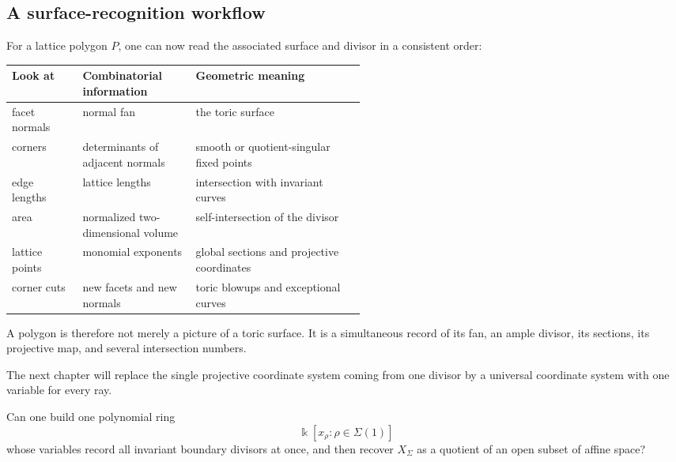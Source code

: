 \subsection{A surface-recognition workflow}

For a lattice polygon \(P\), one can now read the associated surface
and divisor in a consistent order:

\begin{center}
\small
\renewcommand{\arraystretch}{1.3}
\begin{tabularx}{0.94\linewidth}{@{}
  >{\raggedright\arraybackslash}p{0.20\linewidth}
  >{\raggedright\arraybackslash}p{0.32\linewidth}
  >{\raggedright\arraybackslash}X@{}}
\toprule
\textbf{Look at}
&
\textbf{Combinatorial information}
&
\textbf{Geometric meaning}
\\
\midrule
facet normals
&
normal fan
&
the toric surface
\\
corners
&
determinants of adjacent normals
&
smooth or quotient-singular fixed points
\\
edge lengths
&
lattice lengths
&
intersection with invariant curves
\\
area
&
normalized two-dimensional volume
&
self-intersection of the divisor
\\
lattice points
&
monomial exponents
&
global sections and projective coordinates
\\
corner cuts
&
new facets and new normals
&
toric blowups and exceptional curves
\\
\bottomrule
\end{tabularx}
\end{center}

A polygon is therefore not merely a picture of a toric surface. It is
a simultaneous record of its fan, an ample divisor, its sections, its
projective map, and several intersection numbers.

The next chapter will replace the single projective coordinate system
coming from one divisor by a universal coordinate system with one
variable for every ray.

\begin{guidingquestion}
Can one build one polynomial ring
\[
\Bbbk[x_\rho:\rho\in\Sigma(1)]
\]
whose variables record all invariant boundary divisors at once, and
then recover \(X_\Sigma\) as a quotient of an open subset of affine
space?
\end{guidingquestion}


